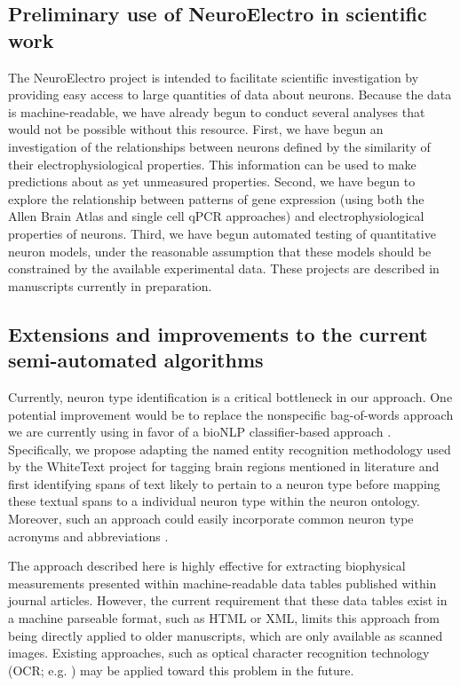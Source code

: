 \documentclass{template/frontiersSCNS} %
\begin{document}
\subsection{Preliminary use of NeuroElectro in scientific work}
The NeuroElectro project is intended to facilitate scientific investigation by providing easy access to large quantities of data about neurons.  
Because the data is machine-readable, we have already begun to conduct several analyses that would not be possible without this resource.  
First, we have begun an investigation of the relationships between neurons defined by the similarity of their electrophysiological properties.  
This information can be used to make predictions about as yet unmeasured properties.  
Second, we have begun to explore the relationship between patterns of gene expression (using both the Allen Brain Atlas and single cell qPCR approaches) and electrophysiological properties of neurons.  
Third, we have begun automated testing of quantitative neuron models, under the reasonable assumption that these models should be constrained by the available experimental data.  
These projects are described in manuscripts currently in preparation.  

\subsection{Extensions and improvements to the current semi-automated algorithms}
Currently, neuron type identification is a critical bottleneck in our approach.  
One potential improvement would be to replace the nonspecific bag-of-words approach we are currently using in favor of a bioNLP classifier-based approach \citep{mccallum_mallet:_2002}.  
Specifically, we propose adapting the named entity recognition methodology used by the WhiteText project for tagging brain regions mentioned in literature \citep{french_automated_2009,french_using_2012} and first identifying spans of text likely to pertain to a neuron type before mapping these textual spans to a individual neuron type within the neuron ontology.  
Moreover, such an approach could easily incorporate common neuron type acronyms and abbreviations \citep{okazaki_building_2006}.

The approach described here is highly effective for extracting biophysical measurements presented within machine-readable data tables published within journal articles.  
However, the current requirement that these data tables exist in a machine parseable format, such as HTML or XML, limits this approach from being directly applied to older manuscripts, which are only available as scanned images.  
Existing approaches, such as optical character recognition technology (OCR; e.g. \citep{ramakrishnan_layout-aware_2012}) may be applied toward this problem in the future. 
\end{document}
